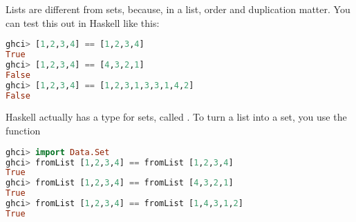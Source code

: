 Lists are different from sets, because, in a list, order and
duplication matter. You can test this out in Haskell like this:

\begin{lstlisting}[language=Haskell,caption={List equality in Haskell}]
ghci> [1,2,3,4] == [1,2,3,4]
True
ghci> [1,2,3,4] == [4,3,2,1]
False
ghci> [1,2,3,4] == [1,2,3,1,3,3,1,4,2]
False
\end{lstlisting}

Haskell actually has a type for sets, called . To turn
a list into a set, you use the function 

\begin{lstlisting}[language=Haskell,caption={Set equality in Haskell}]
ghci> import Data.Set
ghci> fromList [1,2,3,4] == fromList [1,2,3,4]
True
ghci> fromList [1,2,3,4] == fromList [4,3,2,1]
True
ghci> fromList [1,2,3,4] == fromList [1,4,3,1,2]
True
\end{lstlisting}